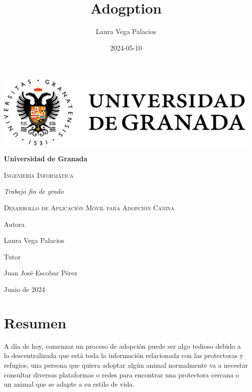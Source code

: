 \documentclass[a4paper, 12pt]{article}
\title{Adogption}
\date{2024-05-10}
\author{Laura Vega Palacios}
\begin{document}
\begin{titlepage}
	\pagestyle{plain}
	\centering
	{\includegraphics[width=1\textwidth]{logoUGR.png}\par}
	{\bfseries\LARGE Universidad de Granada \par}
	{\scshape\Large Ingeniería Informática \par}
	\vspace{0.5cm}
	{\itshape\Large Trabajo fin de grado \par}
	{\scshape\Huge Desarrollo de Aplicación Móvil para Adopción Canina \par}
	\vfill
	{\Large Autora \par}
	{\Large Laura Vega Palacios\par}

	{\Large Tutor \par}
	{\Large Juan José Escobar Pérez\par}
	\vfill
	{\Large Junio de 2024 \par}
\end{titlepage} 

\newpage
\thispagestyle{empty}
\mbox{}

\newpage
\pagestyle{plain}
\section*{Resumen}
A día de hoy, comenzar un proceso de adopción puede ser algo tedioso debido a lo descentralizada que está toda la información relacionada con las protectoras y refugios, una persona que quiera adoptar algún animal normalmente va a necestar consultar diversas plataformas o redes para encontrar una protectora cercana o un animal que se adapte a su estilo de vida.
\end{document}
